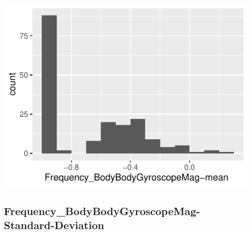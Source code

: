 \documentclass[
]{article}
\begin{document}
\begin{minipage}{0.25 \textwidth}

\includegraphics{codebook_tidydatasub_files/figure-latex/Var-76-Frequency-BodyBodyGyroscopeMag-mean--1.pdf}

\end{minipage}

\noindent\makebox[\linewidth]{\rule{\textwidth}{0.4pt}}

\hypertarget{frequency_bodybodygyroscopemag-standard-deviation}{%
\subsection{Frequency\_BodyBodyGyroscopeMag-Standard-Deviation}\label{frequency_bodybodygyroscopemag-standard-deviation}}
\end{document}
